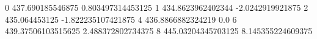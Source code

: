 0 437.690185546875 0.803497314453125
1 434.8623962402344 -2.0242919921875
2 435.064453125 -1.822235107421875
4 436.8866882324219 0.0
6 439.37506103515625 2.488372802734375
8 445.03204345703125 8.145355224609375

